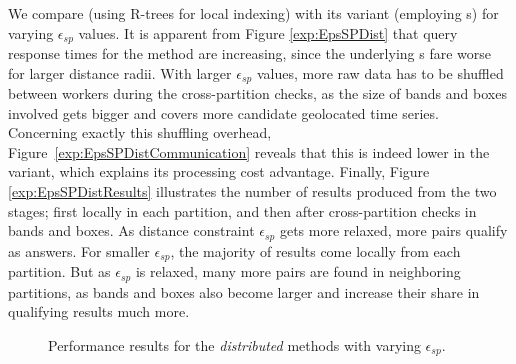 We compare \base (using R-trees for local indexing) with its \opt variant (employing {\btsr}s) for varying $\epsilon_{sp}$ values. It is apparent from Figure \ref{exp:EpsSPDist} that query response times for the \base method are increasing, since the underlying {\rtree}s fare worse for larger distance radii. With larger $\epsilon_{sp}$ values, more raw data has to be shuffled between workers during the cross-partition checks, as the size of bands and boxes involved gets bigger and covers more candidate geolocated time series. Concerning exactly this shuffling overhead, Figure~\ref{exp:EpsSPDistCommunication} reveals that this is indeed lower in the \opt variant, which explains its processing cost advantage. Finally, Figure \ref{exp:EpsSPDistResults} illustrates the number of results produced from the two stages; first locally in each partition, and then after cross-partition checks in bands and boxes. As distance constraint $\epsilon_{sp}$ gets more relaxed, more pairs qualify as answers. For smaller $\epsilon_{sp}$, the majority of results come locally from each partition. But as $\epsilon_{sp}$ is relaxed, many more pairs are found in neighboring partitions, as bands and boxes also become larger and increase their share in qualifying results much more.

\begin{figure}[!tb]
 \centering
 \caption{Performance results for the {\em distributed} methods with varying $\epsilon_{sp}$.}
 \label{exp:distr_EpsSP}
\end{figure}

